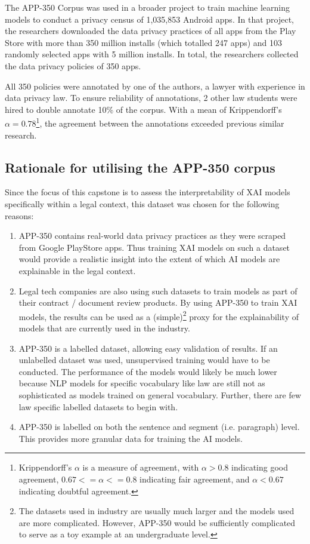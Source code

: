 The APP-350 Corpus was used in a broader project to train machine learning models to conduct a privacy census of 1,035,853 Android apps. In that project, the researchers downloaded the data privacy practices of all apps from the Play Store with more than 350 million installs (which totalled 247 apps) and 103 randomly selected apps with 5 million installs. In total, the researchers collected the data privacy policies of 350 apps.

All 350 policies were annotated by one of the authors, a lawyer with experience in data privacy law. To ensure reliability of annotations, 2 other law students were hired to double annotate 10\% of the corpus. With a mean of Krippendorff's $\alpha = 0.78$\footnote{Krippendorff's $\alpha$ is a measure of agreement, with $\alpha > 0.8$ indicating good agreement, $0.67 <= \alpha <= 0.8$ indicating fair agreement, and $\alpha < 0.67$ indicating doubtful agreement.}, the agreement between the annotations exceeded previous similar research.

\subsection{Rationale for utilising the APP-350 corpus}
Since the focus of this capstone is to assess the interpretability of XAI models specifically within a legal context, this dataset was chosen for the following reasons:
\begin{enumerate}
	\item APP-350 contains real-world data privacy practices as they were scraped from Google PlayStore apps. Thus training XAI models on such a dataset would provide a realistic insight into the extent of which AI models are explainable in the legal context.
	\item Legal tech companies are also using such datasets to train models as part of their contract / document review products. By using APP-350 to train XAI models, the results can be used as a (simple)\footnote{The datasets used in industry are usually much larger and the models used are more complicated. However, APP-350 would be sufficiently complicated to serve as a toy example at an undergraduate level.} proxy for the explainability of models that are currently used in the industry.
	\item APP-350 is a labelled dataset, allowing easy validation of results. If an unlabelled dataset was used, unsupervised training would have to be conducted. The performance of the models would likely be much lower because NLP models for specific vocabulary like law are still not as sophisticated as models trained on general vocabulary. Further, there are few law specific labelled datasets to begin with. 
	\item APP-350 is labelled on both the sentence and segment (i.e. paragraph) level. This provides more granular data for training the AI models. 
\end{enumerate}



